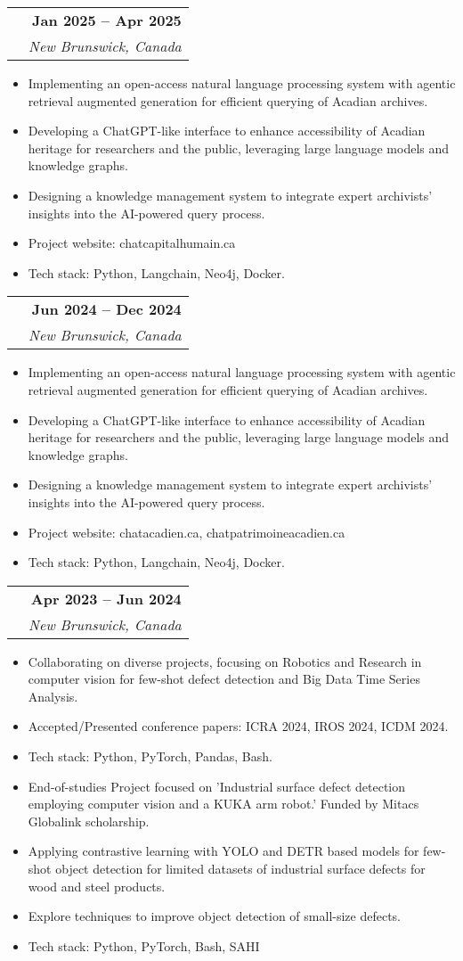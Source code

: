 \documentclass[letterpaper,11pt]{article}
\makeatletter
\newcommand{\resumeItem}[1]{
  \item\small{
    {#1 \vspace{-2pt}}
  }
}
\newcommand{\resumeExperienceSubheading}[4]{
  \vspace{-2pt}\item
    \begin{tabular*}{1.0\textwidth}[t]{@{}p{0.72\textwidth}@{\extracolsep{\fill}}r@{}}
      \textbf{\raggedright #3} & \textbf{\small #2} \\
      \textit{\small\raggedright #1} & \textit{\small #4} \\
    \end{tabular*}\vspace{-7pt}
}
\newcommand{\resumeItemListStart}{\begin{itemize}[label=\textbullet, itemsep=0.2em, topsep=0.2em, parsep=2pt]}
\newcommand{\resumeItemListEnd}{\end{itemize}\vspace{-4pt}}
\makeatother
\begin{document}
\resumeExperienceSubheading
{CFRIA, University of Moncton}{Jan 2025 -- Apr 2025}
{Research Assistant}{New Brunswick, Canada}
\resumeItemListStart
\resumeItem{Implementing an open-access natural language processing system with agentic retrieval augmented generation for efficient querying of Acadian archives.}
\resumeItem{Developing a ChatGPT-like interface to enhance accessibility of Acadian heritage for researchers and the public, leveraging large language models and knowledge graphs.}
\resumeItem{Designing a knowledge management system to integrate expert archivists' insights into the AI-powered query process.}
\resumeItem{Project website: chatcapitalhumain.ca}
\resumeItem{Tech stack: Python, Langchain, Neo4j, Docker.}
\resumeItemListEnd


\resumeExperienceSubheading
{Centre d'études acadiennes Anselme-Chiasson (CEAAC)}{Jun 2024 -- Dec 2024}
{Research Assistant}{New Brunswick, Canada}
\resumeItemListStart
\resumeItem{Implementing an open-access natural language processing system with agentic retrieval augmented generation for efficient querying of Acadian archives.}
\resumeItem{Developing a ChatGPT-like interface to enhance accessibility of Acadian heritage for researchers and the public, leveraging large language models and knowledge graphs.}
\resumeItem{Designing a knowledge management system to integrate expert archivists' insights into the AI-powered query process.}
\resumeItem{Project website: chatacadien.ca, chatpatrimoineacadien.ca}
\resumeItem{Tech stack: Python, Langchain, Neo4j, Docker.}
\resumeItemListEnd


\resumeExperienceSubheading
{CFRIA, University of Moncton}{Apr 2023 -- Jun 2024}
{Research Assistant}{New Brunswick, Canada}
\resumeItemListStart
\resumeItem{Collaborating on diverse projects, focusing on Robotics and Research in computer vision for few-shot defect detection and Big Data Time Series Analysis.}
\resumeItem{Accepted/Presented conference papers: ICRA 2024, IROS 2024, ICDM 2024.}
\resumeItem{Tech stack: Python, PyTorch, Pandas, Bash.}
\resumeItem{End-of-studies Project focused on 'Industrial surface defect detection employing computer vision and a KUKA arm robot.' Funded by Mitacs Globalink scholarship.}
\resumeItem{Applying contrastive learning with YOLO and DETR based models for few-shot object detection for limited datasets of industrial surface defects for wood and steel products.}
\resumeItem{Explore techniques to improve object detection of small-size defects.}
\resumeItem{Tech stack: Python, PyTorch, Bash, SAHI}
\resumeItemListEnd
\end{document}
